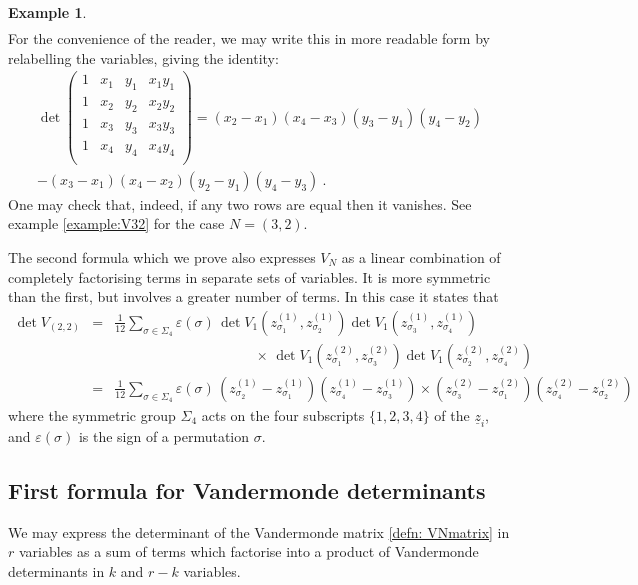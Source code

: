 \documentclass[10pt]{amsart}
\theoremstyle{definition}
\newtheorem{example}[thm]{Example}
\theoremstyle{remark}
\numberwithin{equation}{section}
\newcommand{\z}{\underline{z}}
\newcommand{\0}{\color{blue}{\mathsf{0}}}
\begin{document}
\begin{example}
\begin{eqnarray}
 \end{eqnarray} 
 For the convenience of the reader, we may write this in more readable form by relabelling the variables, giving the identity: 
 \begin{multline} \det  \begin{pmatrix} 1 & x_1 & y_1 & x_1 y_1 \nonumber\\ 
1 & x_2 & y_2 & x_2 y_2  \nonumber\\ 
1 & x_3 & y_3 & x_3 y_3  \nonumber\\ 
1 & x_4 & y_4 & x_4 y_4  \nonumber\\ 
\end{pmatrix} 
=     (x_2-x_1)  (x_4-x_3)  (y_3-y_1)  (y_4-y_2)   \\
 -   (x_3-x_1)  (x_4-x_2)  (y_2-y_1)  (y_4-y_3)    \ . 
 \end{multline}
One may check that, indeed, if any two rows are equal then it vanishes. 
See example \ref{example:V32} for the case $N=(3,2)$.


The second formula which we prove also expresses $V_N$ as a linear combination of completely factorising terms in separate sets of variables. It  is more symmetric than the first,  but involves a greater number of terms.  In this case it states that 
\begin{eqnarray}  \det V_{(2,2)}  &= & \frac{1}{12} \sum_{\sigma \in \Sigma_4}  \varepsilon(\sigma)  \, \det V_1(z^{(1)}_{\sigma_1},z^{(1)}_{\sigma_2}) \det  V_1(z^{(1)}_{\sigma_3},z^{(1)}_{\sigma_4}) \nonumber \\
&&  \qquad \qquad \qquad \qquad \qquad \times \,  \det V_1(z^{(2)}_{\sigma_1},z^{(2)}_{\sigma_3}) \det V_1(z^{(2)}_{\sigma_2},z^{(2)}_{\sigma_4}) \nonumber \\
& = &    \frac{1}{12} \sum_{\sigma \in \Sigma_4}  \varepsilon(\sigma)  \, (z^{(1)}_{\sigma_2} -  z^{(1)}_{\sigma_1}) (z^{(1)}_{\sigma_4}- z^{(1)}_{\sigma_3}) \times  (z^{(2)}_{\sigma_3}- z^{(2)}_{\sigma_1}) (z^{(2)}_{\sigma_4}- z^{(2)}_{\sigma_2})   \nonumber  \end{eqnarray}   
 where the symmetric group $\Sigma_4$ acts on the four subscripts $\{1,2,3,4\}$ of the $\z_i$, and $\varepsilon(\sigma)$ is the sign of a permutation $\sigma$. 
 

\end{example}


\subsection{First formula  for Vandermonde determinants} \label{sect: firstformula} 
We may express the determinant of the Vandermonde matrix \eqref{defn: VNmatrix} in $r$ variables as a sum of terms  which factorise into a product of Vandermonde determinants in $k$ and $r-k$ variables. 
\end{document}
